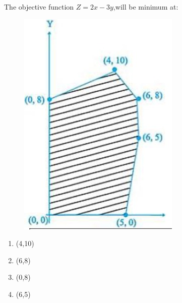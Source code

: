 \documentclass{article}
\begin{document}
\begin{enumerate}
The objective function 
$Z=2x-3y$,will be minimum at:\\
\begin{figure}[h]
    \centering{}
    \includegraphics[width=\columnwidth]{Figs/Fig2.jpg}
    \caption{}
    \label{Fig2}                                        \end{figure}
\begin{enumerate}
    \item (4,10)
    \item (6,8)
    \item (0,8)
    \item (6,5)
    \end{enumerate}
    
\end{enumerate}
\end{document}
